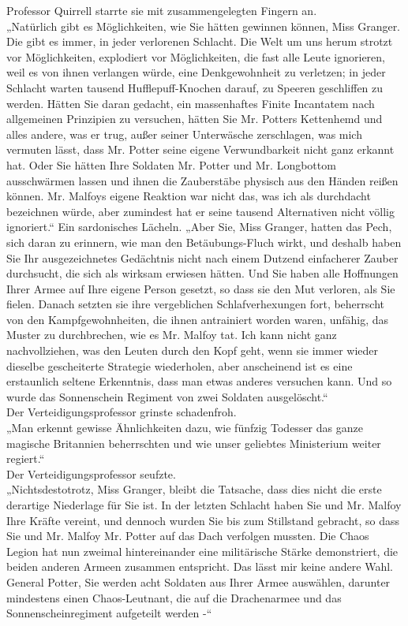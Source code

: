 {Professor Quirrell starrte sie mit zusammengelegten Fingern an.\\ „Natürlich gibt es Möglichkeiten, wie Sie hätten gewinnen können, Miss Granger. Die gibt es immer, in jeder verlorenen Schlacht. Die Welt um uns herum strotzt vor Möglichkeiten, explodiert vor Möglichkeiten, die fast alle Leute ignorieren, weil es von ihnen verlangen würde, eine Denkgewohnheit zu verletzen; in jeder Schlacht warten tausend Hufflepuff-Knochen darauf, zu Speeren geschliffen zu werden. Hätten Sie daran gedacht, ein massenhaftes Finite Incantatem nach allgemeinen Prinzipien zu versuchen, hätten Sie Mr. Potters Kettenhemd und alles andere, was er trug, außer seiner Unterwäsche zerschlagen, was mich vermuten lässt, dass Mr. Potter seine eigene Verwundbarkeit nicht ganz erkannt hat. Oder Sie hätten Ihre Soldaten Mr. Potter und Mr. Longbottom ausschwärmen lassen und ihnen die Zauberstäbe physisch aus den Händen reißen können. Mr. Malfoys eigene Reaktion war nicht das, was ich als durchdacht bezeichnen würde, aber zumindest hat er seine tausend Alternativen nicht völlig ignoriert.“ Ein sardonisches Lächeln. „Aber Sie, Miss Granger, hatten das Pech, sich daran zu erinnern, wie man den Betäubungs-Fluch wirkt, und deshalb haben Sie Ihr ausgezeichnetes Gedächtnis nicht nach einem Dutzend einfacherer Zauber durchsucht, die sich als wirksam erwiesen hätten. Und Sie haben alle Hoffnungen Ihrer Armee auf Ihre eigene Person gesetzt, so dass sie den Mut verloren, als Sie fielen. Danach setzten sie ihre vergeblichen Schlafverhexungen fort, beherrscht von den Kampfgewohnheiten, die ihnen antrainiert worden waren, unfähig, das Muster zu durchbrechen, wie es Mr. Malfoy tat. Ich kann nicht ganz nachvollziehen, was den Leuten durch den Kopf geht, wenn sie immer wieder dieselbe gescheiterte Strategie wiederholen, aber anscheinend ist es eine erstaunlich seltene Erkenntnis, dass man etwas anderes versuchen kann. Und so wurde das Sonnenschein Regiment von zwei Soldaten ausgelöscht.“\\ Der Verteidigungsprofessor grinste schadenfroh.\\ „Man erkennt gewisse Ähnlichkeiten dazu, wie fünfzig Todesser das ganze magische Britannien beherrschten und wie unser geliebtes Ministerium weiter regiert.“\\ Der Verteidigungsprofessor seufzte.\\ „Nichtsdestotrotz, Miss Granger, bleibt die Tatsache, dass dies nicht die erste derartige Niederlage für Sie ist. In der letzten Schlacht haben Sie und Mr. Malfoy Ihre Kräfte vereint, und dennoch wurden Sie bis zum Stillstand gebracht, so dass Sie und Mr. Malfoy Mr. Potter auf das Dach verfolgen mussten. Die Chaos Legion hat nun zweimal hintereinander eine militärische Stärke demonstriert, die beiden anderen Armeen zusammen entspricht. Das lässt mir keine andere Wahl. General Potter, Sie werden acht Soldaten aus Ihrer Armee auswählen, darunter mindestens einen Chaos-Leutnant, die auf die Drachenarmee und das Sonnenscheinregiment aufgeteilt werden -“

}
